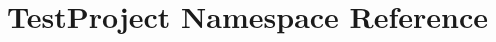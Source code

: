 \hypertarget{namespace_test_project}{}\section{Test\+Project Namespace Reference}
\label{namespace_test_project}
